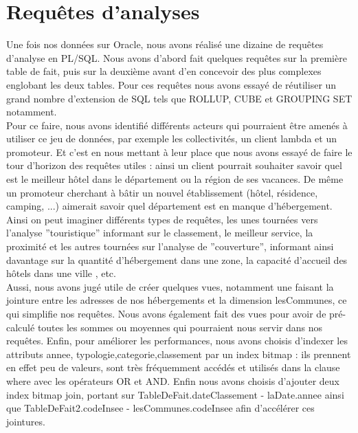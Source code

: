 \documentclass[a4paper,sffamily,12pt]{article}
\begin{document}
		\vspace{0.5cm}
			
	\section{Requêtes d'analyses}

		\vspace{0.5cm}
		
		Une fois nos données sur Oracle, nous avons réalisé une dizaine de requêtes d'analyse en PL/SQL. Nous avons d'abord fait quelques requêtes sur la première table de fait, puis sur la deuxième avant d'en concevoir des plus complexes englobant les deux tables. Pour ces requêtes nous avons essayé de réutiliser un grand nombre d'extension de SQL tels que ROLLUP, CUBE et GROUPING SET notamment. \\		
		
		Pour ce faire, nous avons identifié différents acteurs qui pourraient être amenés à utiliser ce jeu de données, par exemple les collectivités, un client lambda et un promoteur. Et c'est en nous mettant à leur place que nous avons essayé de faire le tour d'horizon des requêtes utiles : ainsi un client pourrait souhaiter savoir quel est le meilleur hôtel dans le département ou la région de ses vacances. De même un promoteur cherchant à bâtir un nouvel établissement (hôtel, résidence, camping, ...) aimerait savoir quel département est en manque d'hébergement. Ainsi on peut imaginer différents types de requêtes, les unes tournées vers l'analyse ''touristique'' informant sur le classement, le meilleur service, la proximité et les autres tournées sur l'analyse de ''couverture'', informant ainsi davantage sur la quantité d'hébergement dans une zone, la capacité d'accueil des hôtels dans une ville , etc. \\
		
		Aussi, nous avons jugé utile de créer quelques vues, notamment une faisant la jointure entre les adresses de nos hébergements et la dimension lesCommunes, ce qui simplifie nos requêtes. Nous avons également fait des vues pour avoir de pré-calculé toutes les sommes ou moyennes qui pourraient nous servir dans nos requêtes. Enfin, pour améliorer les performances, nous avons choisis d'indexer les attributs annee, typologie,categorie,classement par un index bitmap : ils prennent en effet peu de valeurs, sont très fréquemment accédés et utilisés dans la clause where avec les opérateurs OR et AND. Enfin nous avons choisis d'ajouter deux index bitmap join, portant sur TableDeFait.dateClassement - laDate.annee ainsi que TableDeFait2.codeInsee - lesCommunes.codeInsee afin d'accélérer ces jointures. \\
		
\end{document}
